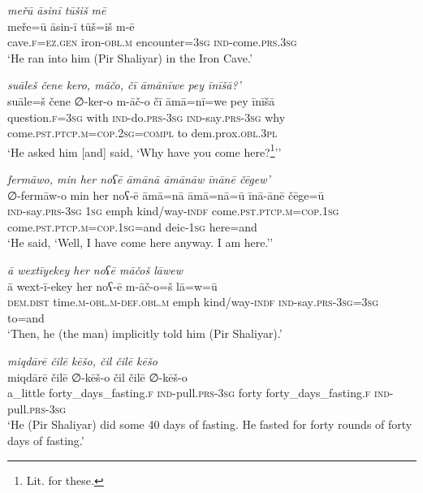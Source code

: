 \ea \label{ŽP.133}
\textit{meřū āsinī tūšiš mē} \\ 
\gll meře=ū āsin-ī tūš=iš m-ē \\ 
 cave\textsc{.f}\textsc{\textsc{=ez.gen}} iron\textsc{-obl}\textsc{.m} encounter\textsc{=3sg} \textsc{ind-}come\textsc{.prs}\textsc{.3sg} \\ 
\glt `He ran into him (Pir Shaliyar) in the Iron Cave.'
\z 
 
\ea \label{ŽP.135}
\textit{suāleš čene kero, māčo, čī āmānīwe pey īnīšā?’} \\ 
\gll suāle=š čene ∅-ker-o m-āč-o čī āmā=nī=we pey īnīšā \\ 
 question\textsc{.f}\textsc{=3sg} with \textsc{ind-}do\textsc{.prs}\textsc{-3sg} \textsc{ind-}say\textsc{.prs}\textsc{-3sg} why come\textsc{.pst}\textsc{.ptcp}\textsc{.m}\textsc{=cop}\textsc{.\textsc{2sg}}\textsc{=compl} to dem.prox\textsc{.obl}\textsc{.3pl} \\ 
\glt `He asked him [and] said, ‘Why have you come here?\footnote{Lit. for these.}’'
\z 
 
\ea \label{ŽP.136}
\textit{fermāwo, min her noʕē āmānā āmānāw īnānē čēgew’} \\ 
\gll ∅-fermāw-o min her noʕ-ē āmā=nā āmā=nā=ū īnā-ānē čēge=ū \\ 
 \textsc{ind-}say\textsc{.prs}\textsc{-3sg} \textsc{1sg} emph kind/way\textsc{-indf} come\textsc{.pst}\textsc{.ptcp}\textsc{.m}\textsc{=cop}\textsc{.\textsc{1sg}} come\textsc{.pst}\textsc{.ptcp}\textsc{.m}\textsc{=cop}\textsc{.\textsc{1sg}}=and deic\textsc{-\textsc{1sg}} here=and \\ 
\glt `He said, ‘Well, I have come here anyway. I am here.’'
\z 
 
\ea \label{ŽP.137}
\textit{ā wextīyekey her noʕē māčoš lāwew} \\ 
\gll ā wext-ī-ekey her noʕ-ē m-āč-o=š lā=w=ū \\ 
 \textsc{dem.dist} time\textsc{.m}\textsc{-obl}\textsc{.m}\textsc{-def}\textsc{.obl}\textsc{.m} emph kind/way\textsc{-indf} \textsc{ind-}say\textsc{.prs}\textsc{-3sg}\textsc{=3sg} to=and \\ 
\glt `Then, he (the man) implicitly told him (Pir Shaliyar).'
\z 
 
\ea \label{ŽP.139}
\textit{miqdārē čilē kēšo, čil čilē kēšo} \\ 
\gll miqdārē čilē ∅-kēš-o čil čilē ∅-kēš-o \\ 
 a\_little forty\_days\_fasting\textsc{.f} \textsc{ind-}pull\textsc{.prs}\textsc{-3sg} forty forty\_days\_fasting\textsc{.f} \textsc{ind-}pull\textsc{.prs}\textsc{-3sg} \\ 
\glt `He (Pir Shaliyar) did some 40 days of fasting. He fasted for forty rounds of forty days of fasting.'
\z 
 
